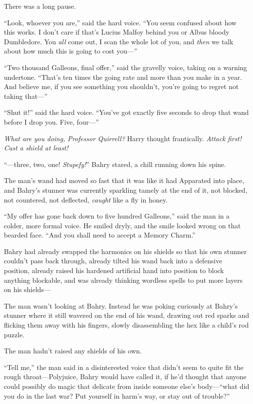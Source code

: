 There was a long pause.

“Look, whoever you are,” said the hard voice. “You seem confused about how this works. I don’t care if that’s Lucius Malfoy behind you or Albus bloody Dumbledore. You \emph{all} come out, I scan the whole lot of you, and \emph{then} we talk about how much this is going to cost you—”

“Two thousand Galleons, final offer,” said the gravelly voice, taking on a warning undertone. “That’s ten times the going rate and more than you make in a year. And believe me, if you see something you shouldn’t, you’re going to regret not taking that—”

“Shut it!” said the hard voice. “You’ve got exactly five seconds to drop that wand before I drop you. Five, four—”

\emph{What are you doing, Professor Quirrell?} Harry thought frantically. \emph{Attack first! Cast a shield at least!}

“—three, two, one! \emph{Stupefy!}”
\sbreak
Bahry stared, a chill running down his spine.

The man’s wand had moved so fast that it was like it had Apparated into place, and Bahry’s stunner was currently sparkling tamely at the end of it, not blocked, not countered, not deflected, \emph{caught} like a fly in honey.

“My offer has gone back down to five hundred Galleons,” said the man in a colder, more formal voice. He smiled dryly, and the smile looked wrong on that bearded face. “And you shall need to accept a Memory Charm.”

Bahry had already swapped the harmonics on his shields so that his own stunner couldn’t pass back through, already tilted his wand back into a defensive position, already raised his hardened artificial hand into position to block anything blockable, and was already thinking wordless spells to put more layers on his shields—

The man wasn’t looking at Bahry. Instead he was poking curiously at Bahry’s stunner where it still wavered on the end of his wand, drawing out red sparks and flicking them away with his fingers, slowly disassembling the hex like a child’s rod puzzle.

The man hadn’t raised any shields of his own.

“Tell me,” the man said in a disinterested voice that didn’t seem to quite fit the rough throat—Polyjuice, Bahry would have called it, if he’d thought that anyone could possibly do magic that delicate from inside someone else’s body—“what did you do in the last war? Put yourself in harm’s way, or stay out of trouble?”

